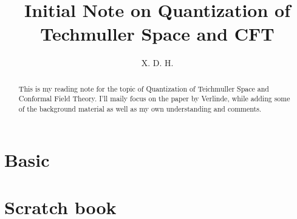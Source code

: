 \documentclass[12pt]{article}
\begin{document}
\title{\boldmath Initial Note on Quantization of Techmuller Space and CFT}
\author{X. D. H.}

\maketitle

\begin{abstract}
  This is my reading note for the topic of Quantization of Teichmuller Space and Conformal Field Theory. I'll maily focus on the paper by Verlinde, while adding some of the background material as well as my own understanding and comments.
\end{abstract}

\tableofcontents

\section{Basic}\label{sec:Basic} %


\section{Scratch book}\label{sec:Scratch book} %

\end{document}
